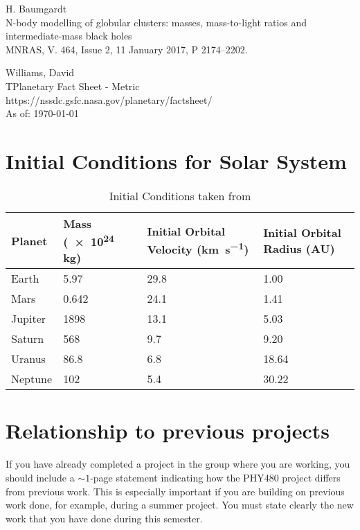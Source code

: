 \documentclass[a4paper,10pt]{article}
\begin{document}
\begin{thebibliography}{9}
H. Baumgardt\\
N-body modelling of globular clusters: masses, mass-to-light ratios and intermediate-mass black holes\\
MNRAS, V. 464, Issue 2, 11 January 2017, P 2174--2202.

Williams, David\\
TPlanetary Fact Sheet - Metric\\
https://nssdc.gsfc.nasa.gov/planetary/factsheet/\\ As of: \today

\end{thebibliography}


\begin{appendix}

\section{Initial Conditions for Solar System}\label{cond}
\begin{table}[H]
\begin{tabular}{l|l|l|l}
Planet  & Mass (\num{e24} \si{\kilo\gram}) & Initial Orbital Velocity (\si{\kilo\metre\per\second}) & Initial Orbital Radius (AU) \\ \hline
Earth   & 5.97                                     & 29.8                                                & 1.00                        \\
Mars    & 0.642                                    & 24.1                                                & 1.41                        \\
Jupiter & 1898                                     & 13.1                                                & 5.03                        \\
Saturn  & 568                                      & 9.7                                                 & 9.20                        \\
Uranus  & 86.8                                     & 6.8                                                 & 18.64                       \\
Neptune & 102                                      & 5.4                                                 & 30.22                      
\end{tabular}
\caption{\label{InitConds}Initial Conditions taken from \cite{PlanetFacts}}
\end{table}

\section{Relationship to previous projects}
If you have already completed a project in the group where you are working, you should include a $\sim 1$-page statement indicating how the PHY480 project differs from previous work. This is especially important if you are building on previous work done, for example, during a summer project. You must state clearly the new work that you have done during this semester.

\end{appendix}
\end{document}
